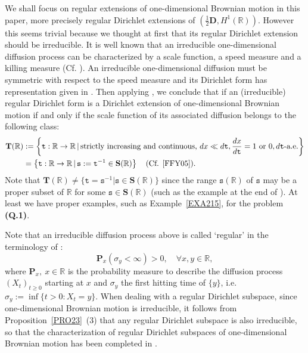 \documentclass[a4paper]{amsart}
\theoremstyle{definition}
\theoremstyle{remark}
\numberwithin{equation}{section}
\begin{document}
We shall focus on regular extensions of one-dimensional Brownian motion in this paper, 
more precisely regular Dirichlet extensions of $(\frac{1}{2}\mathbf{D}, H^1(\mathbb{R}))$. 
However this seems trivial because we thought at first that its regular Dirichlet extension should be irreducible. It is well known that an irreducible one-dimensional diffusion process can be characterized by a scale function, a speed measure and a killing measure (Cf. \cite{IM74}). An irreducible one-dimensional diffusion must be symmetric with respect to the speed measure and its Dirichlet form has representation given in \cite[Theorem~3.1]{FHY10}. Then applying \cite[Theorem~4.1]{FHY10}, we conclude that if an (irreducible) regular Dirichlet form is a Dirichlet extension of one-dimensional Brownian motion if and only if the scale function of its associated diffusion belongs to the following class:
\begin{equation}\label{EQ1TRT}
\begin{aligned}
\mathbf{T}(\mathbb{R})
& :=\left\{{{\mathtt{t}}}:\mathbb{R}\rightarrow \mathbb{R}\,|\, \text{strictly increasing and continuous, }dx\ll d{{\mathtt{t}}}, \frac{dx}{d{{\mathtt{t}}}}=1\text{ or }0, d{{\mathtt{t}}}\text{-a.e.}\right\} \\
&=\left\{{{\mathtt{t}}}: \mathbb{R}\rightarrow \mathbb{R}\,|\, {{\mathtt{s}}}:={{\mathtt{t}}}^{-1}\in \mathbf{S}(\mathbb{R})\right\} \quad \text{(Cf. \cite[Theorem~4.1]{FFY05})}.
\end{aligned}
\end{equation}
Note that ${{\mathbf{T}}}(\mathbb{R})\neq \{{{\mathtt{t}}}={{\mathtt{s}}}^{-1}| {{\mathtt{s}}}\in {{\mathbf{S}}}(\mathbb{R})\}$ since the range ${{\mathtt{s}}}(\mathbb{R})$ of ${{\mathtt{s}}}$ may be a proper subset of $\mathbb{R}$ for some ${{\mathtt{s}}}\in {{\mathbf{S}}}(\mathbb{R})$ (such as the example at the end of \cite{FFY05}). At least we have proper examples, such as Example~\ref{EXA215}, for the problem \textbf{(Q.1)}.

Note that an irreducible diffusion process above is called `regular' in the terminology of \cite[(45.2)]{RW87}:
\[
	\mathbf{P}_x(\sigma_y<\infty)>0,\quad \forall x,y \in\mathbb{R},
\]
where $\mathbf{P}_x,\ {x\in \mathbb{R}}$ is the probability measure to describe the diffusion process $(X_t)_{t\geq 0}$
starting at $x$ and $\sigma_y$ the first hitting time of $\{y\}$, i.e. $\sigma_y:=\inf\{t>0: X_t=y\}$.
 When dealing with a regular Dirichlet subspace, since one-dimensional Brownian motion is irreducible,
 it follows from Proposition~\ref{PRO23}~(3) that any regular Dirichlet subspace is also irreducible,
so that the characterization of regular Dirichlet subspaces of one-dimensional Brownian motion has been completed in \cite{FFY05}.
\end{document}
